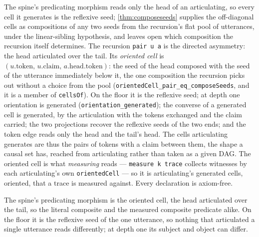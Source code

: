 \begin{theorem}\label{thm:oriented-cell}\leanok{}
The spine's predicating morphism reads only the head of an articulating, so every
cell it generates is the reflexive seed; \cref{thm:composeseeds} supplies the
off-diagonal cells as compositions of any two seeds from the recursion's flat pool
of utterances, under the linear-sibling hypothesis, and leaves open which
composition the recursion itself determines. The recursion \texttt{pair u a} is the
directed asymmetry: the head articulated over the tail. Its \emph{oriented cell} is
$(u.\mathrm{token},\,u.\mathrm{claim},\,a.\mathrm{head}.\mathrm{token})$: the seed
of the head composed with the seed of the utterance immediately below it, the one
composition the recursion picks out without a choice from the pool
(\texttt{orientedCell\_pair\_eq\_composeSeeds}, and it is a member of
\texttt{cellsOf}). On the floor it is the reflexive seed; at depth one orientation
is generated (\texttt{orientation\_generated}); the converse of a generated cell is
generated, by the articulation with the tokens exchanged and the claim carried; the
two projections recover the reflexive seeds of the two ends; and the token edge reads
only the head and the tail's head. The cells articulating generates are thus the
pairs of tokens with a claim between them, the shape a causal set has, reached from
articulating rather than taken as a given DAG. The
oriented cell is what \emph{measuring} reads --- \texttt{measure k trace} collects
witnesses by each articulating's own \texttt{orientedCell} --- so it is
articulating's generated cells, oriented, that a trace is measured against. Every
declaration is axiom-free.
\end{theorem}
\begin{theorem}\label{thm:spine-predicate-oriented}\leanok{}
The spine's predicating morphism is the oriented cell, the head articulated over
the tail, so the literal composite and the measured composite predicate alike. On
the floor it is the reflexive seed of the one utterance, so nothing that articulated
a single utterance reads differently; at depth one its subject and object can differ.
\end{theorem}
